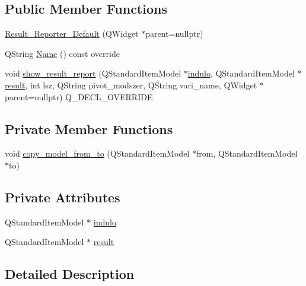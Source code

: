 \subsection*{Public Member Functions}
\begin{DoxyCompactItemize}
\item 
\hyperlink{classResult__Reporter__Default_a220d065072f8aa3ef351094b1710560e}{Result\+\_\+\+Reporter\+\_\+\+Default} (Q\+Widget $\ast$parent=nullptr)
\item 
Q\+String \hyperlink{classResult__Reporter__Default_af1794a748e246ed0113e85e1f25e2907}{Name} () const override
\item 
void \hyperlink{classResult__Reporter__Default_a0cd7068847fcea1f0f4a6ba82441c4c6}{show\+\_\+result\+\_\+report} (Q\+Standard\+Item\+Model $\ast$\hyperlink{classResult__Reporter__Default_a4a153e327295c0f0b94a42712bca86b8}{indulo}, Q\+Standard\+Item\+Model $\ast$\hyperlink{classResult__Reporter__Default_a654d38fe6778e3b1f29af621fb751312}{result}, int lsz, Q\+String pivot\+\_\+modszer, Q\+String vari\+\_\+name, Q\+Widget $\ast$parent=nullptr) Q\+\_\+\+D\+E\+C\+L\+\_\+\+O\+V\+E\+R\+R\+I\+DE
\end{DoxyCompactItemize}
\subsection*{Private Member Functions}
\begin{DoxyCompactItemize}
\item 
void \hyperlink{classResult__Reporter__Default_ade704443b64152780c51eb792fe42801}{copy\+\_\+model\+\_\+from\+\_\+to} (Q\+Standard\+Item\+Model $\ast$from, Q\+Standard\+Item\+Model $\ast$to)
\end{DoxyCompactItemize}
\subsection*{Private Attributes}
\begin{DoxyCompactItemize}
\item 
Q\+Standard\+Item\+Model $\ast$ \hyperlink{classResult__Reporter__Default_a4a153e327295c0f0b94a42712bca86b8}{indulo}
\item 
Q\+Standard\+Item\+Model $\ast$ \hyperlink{classResult__Reporter__Default_a654d38fe6778e3b1f29af621fb751312}{result}
\end{DoxyCompactItemize}


\subsection{Detailed Description}


